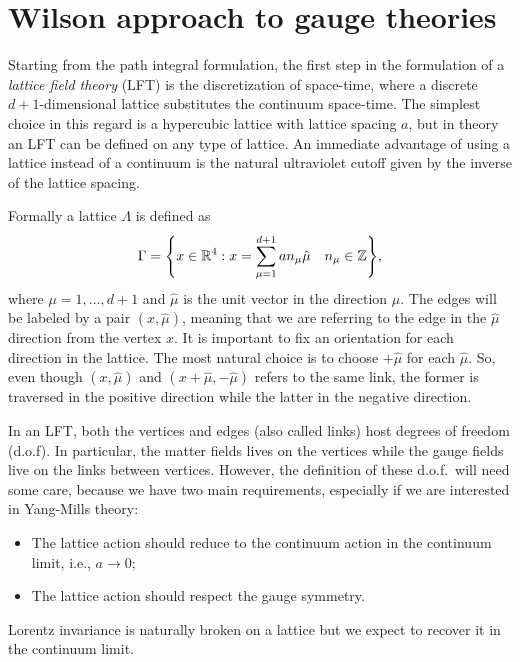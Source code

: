 \section{Wilson approach to gauge theories}
\label{sec:wilson_approach_to_gauge_theories}



Starting from the path integral formulation, the first step in the formulation of a \emph{lattice field theory} (LFT) is the discretization of space-time, where a discrete $d+1$-dimensional lattice substitutes the continuum space-time.
The simplest choice in this regard is a hypercubic lattice with lattice spacing $a$, but in theory an LFT can be defined on any type of lattice.
An immediate advantage of using a lattice instead of a continuum is the natural ultraviolet cutoff given by the inverse of the lattice spacing.

Formally a lattice $\Lambda$ is defined as
\begin{equation}
    \Gamma = \qty{
        x \in \mathbb{R}^4 :
        x = \sum_{\mu = 1}^{d+1} a n_{\mu} \hat{\mu} \quad
        n_{\mu} \in \mathbb{Z}},
\end{equation}
where $\mu = 1, \dots, d+1$ and $\hat{\mu}$ is the unit vector in the direction $\mu$.
The edges will be labeled by a pair $(x,\hat{\mu})$, meaning that we are referring to the edge in the $\hat{\mu}$ direction from the vertex $x$.
It is important to fix an orientation for each direction in the lattice.
The most natural choice is to choose $+ \hat{\mu}$ for each $\hat{\mu}$.
So, even though $(x,\hat{\mu})$ and $(x + \hat{\mu}, - \hat{\mu})$ refers to the same link, the former is traversed in the positive direction while the latter in the negative direction.

In an LFT, both the vertices and edges (also called links) host degrees of freedom (d.o.f).
In particular, the matter fields lives on the vertices while the gauge fields live on the links between vertices.
However, the definition of these d.o.f.~will need some care, because we have two main requirements, especially if we are interested in Yang-Mills theory:
\begin{itemize}
    \item The lattice action should reduce to the continuum action in the continuum limit, i.e., $a \to 0$;
    \item The lattice action should respect the gauge symmetry.
\end{itemize}
Lorentz invariance is naturally broken on a lattice but we expect to recover it in the continuum limit.


